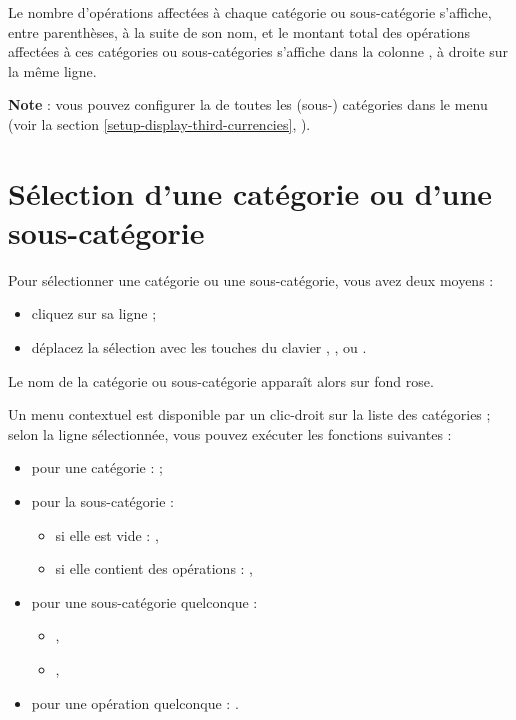 Le nombre d'opérations affectées à chaque catégorie ou sous-catégorie s'affiche, entre parenthèses, à la suite de son nom, et le montant total des opérations affectées à ces catégories ou sous-catégories s'affiche dans la colonne , à droite sur la même ligne. 


\textbf{Note} : vous pouvez configurer la  de toutes les (sous-) catégories dans le menu  (voir la section \vref{setup-display-third-currencies}, ).


\section{Sélection d'une catégorie ou d'une sous-catégorie\label{categories-selection}}


Pour sélectionner une catégorie ou une sous-catégorie, vous avez deux moyens :

\begin{itemize}
	 \item cliquez sur sa ligne ;
	 \item déplacez la sélection avec les touches du clavier , ,  ou .
\end{itemize}

Le nom de la catégorie ou sous-catégorie apparaît alors sur fond rose{\couleur}.

Un menu contextuel est disponible par un clic-droit sur la liste des catégories ; selon la ligne sélectionnée, vous pouvez exécuter les fonctions suivantes :

\begin{itemize}
	 \item pour une catégorie :  ;
	 \item pour la sous-catégorie  :
		\begin{itemize}
			 \item si elle est vide : ,
			 \item si elle contient des opérations : ,
		\end{itemize}
	 \item pour	une sous-catégorie quelconque :	
		\begin{itemize}
			 \item {},
			 \item {},			 
		\end{itemize}		
	 \item pour une opération quelconque : .	
\end{itemize}


